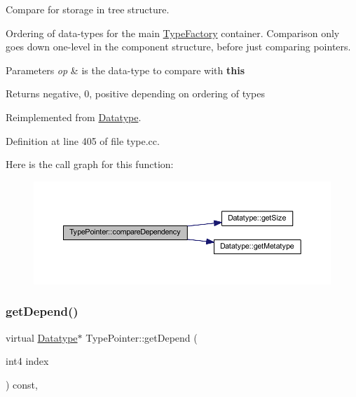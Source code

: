 Compare for storage in tree structure. 

Ordering of data-\/types for the main \mbox{\hyperlink{class_type_factory}{Type\+Factory}} container. Comparison only goes down one-\/level in the component structure, before just comparing pointers. 
\begin{DoxyParams}{Parameters}
{\em op} & is the data-\/type to compare with {\bfseries{this}} \\
\hline
\end{DoxyParams}
\begin{DoxyReturn}{Returns}
negative, 0, positive depending on ordering of types 
\end{DoxyReturn}


Reimplemented from \mbox{\hyperlink{class_datatype_ab26e4ca2c3091d3c5a34b4fbd7be76ae}{Datatype}}.



Definition at line 405 of file type.\+cc.

Here is the call graph for this function\+:
\nopagebreak
\begin{figure}[H]
\begin{center}
\leavevmode
\includegraphics[width=350pt]{class_type_pointer_a20dfb07c24c08242c21ae856508197fe_cgraph}
\end{center}
\end{figure}
\mbox{\label{class_type_pointer_ac63c41e423f88eca13459135f86c7d32}} 
\subsubsection{\texorpdfstring{getDepend()}{getDepend()}}
{\footnotesize\ttfamily virtual \mbox{\hyperlink{class_datatype}{Datatype}}$\ast$ Type\+Pointer\+::get\+Depend (\begin{DoxyParamCaption}\item[{int4}]{index }\end{DoxyParamCaption}) const\hspace{0.3cm}{\ttfamily [inline]}, {\ttfamily [virtual]}}



